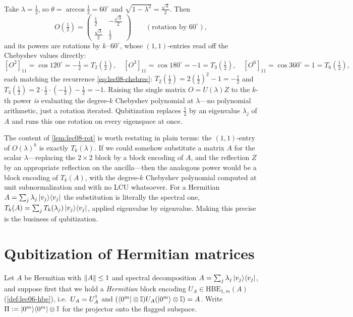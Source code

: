 \begin{example}[The rotation picture with numbers: $\lambda=\tfrac12$]
\label{exa:lec08-cheb}
Take $\lambda=\tfrac12$, so $\theta=\arccos\tfrac12=60^{\circ}$ and
$\sqrt{1-\lambda^2}=\tfrac{\sqrt3}{2}$. Then
\[
  O(\tfrac12)=\begin{pmatrix}\tfrac12&-\tfrac{\sqrt3}{2}\\[2pt]
    \tfrac{\sqrt3}{2}&\tfrac12\end{pmatrix}
  \qquad(\text{rotation by }60^{\circ}),
\]
and its powers are rotations by $k\cdot60^{\circ}$, whose $(1,1)$-entries read off the
Chebyshev values directly:
\[
  [O^2]_{11}=\cos120^{\circ}=-\tfrac12=T_2(\tfrac12),\quad
  [O^3]_{11}=\cos180^{\circ}=-1=T_3(\tfrac12),\quad
  [O^6]_{11}=\cos360^{\circ}=1=T_6(\tfrac12),
\]
each matching the recurrence \eqref{eq:lec08-chebrec}: $T_2(\tfrac12)=2(\tfrac12)^2-1
=-\tfrac12$ and $T_3(\tfrac12)=2\cdot\tfrac12\cdot(-\tfrac12)-\tfrac12=-1$. Raising the
single matrix $O=U(\lambda)Z$ to the $k$-th power \emph{is} evaluating the degree-$k$
Chebyshev polynomial at $\lambda$---no polynomial arithmetic, just a rotation
iterated. Qubitization replaces $\tfrac12$ by an eigenvalue $\lambda_j$ of $A$ and
runs this one rotation on every eigenspace at once.
\end{example}

The content of \cref{lem:lec08-rot} is worth restating in plain terms: the
$(1,1)$-entry of $O(\lambda)^k$ is exactly $T_k(\lambda)$. If we could somehow
substitute a matrix $A$ for the scalar $\lambda$---replacing the $2\times2$ block by
a block encoding of $A$, and the reflection $Z$ by an appropriate reflection on the
ancilla---then the analogous power would be a block encoding of $T_k(A)$, with the
degree-$k$ Chebyshev polynomial computed at unit subnormalization and with no LCU
whatsoever. For a Hermitian $A=\sum_j\lambda_j\ket{v_j}\!\bra{v_j}$ the substitution is
literally the spectral one, $T_k(A)=\sum_j T_k(\lambda_j)\ket{v_j}\!\bra{v_j}$, applied
eigenvalue by eigenvalue. Making this precise is the business of qubitization.

\section{Qubitization of Hermitian matrices}
\label{sec:lec08-2}

Let $A$ be Hermitian with $\left\lVert A \right\rVert\le1$ and spectral decomposition
$A=\sum_j\lambda_j\ket{v_j}\!\bra{v_j}$, and suppose first that we hold a \emph{Hermitian}
block encoding $U_A\in\mathrm{HBE}_{1,m}(A)$ (\cref{def:lec06-hbe}), i.e.\
$U_A=U_A^{\dagger}$ and $(\bra{0^m}\otimes\mathbb{I})U_A(\ket{0^m}\otimes\mathbb{I})=A$. Write
$\Pi\vcentcolon=\ket{0^m}\!\bra{0^m}\otimes\mathbb{I}$ for the projector onto the flagged subspace.

